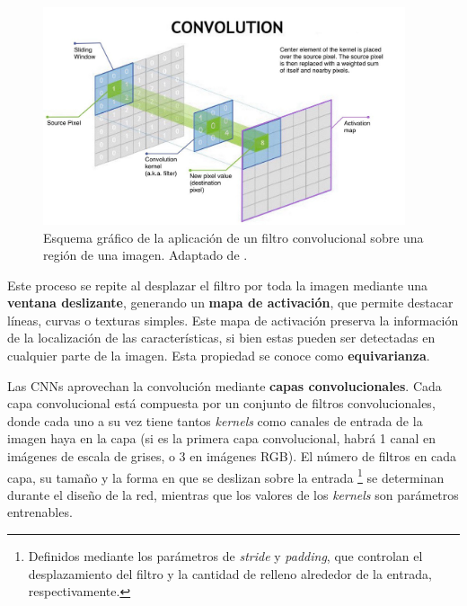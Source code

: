 \begin{figure}[h]
    \centering
    \includegraphics[width=0.95\textwidth]{capitulos/cap_02/imagenes/convolution_operation.jpg}
    \caption[Esquema gráfico de la aplicación de un filtro convolucional sobre una región de una imagen.]{
        Esquema gráfico de la aplicación de un filtro convolucional sobre una región de una imagen.
        Adaptado de \cite{nvidia2025convolutionoperation}.
    } 
    \label{fig:conv_op}
\end{figure}

Este proceso se repite al desplazar el filtro por toda la imagen mediante una \textbf{ventana deslizante}, 
generando un \textbf{mapa de activación}, que permite destacar líneas, curvas o texturas simples. Este mapa de
activación preserva la información de la localización de las características, si bien estas pueden ser 
detectadas en cualquier parte de la imagen. Esta propiedad se conoce como \textbf{equivarianza}. 

Las CNNs aprovechan la convolución mediante \textbf{capas convolucionales}. Cada capa convolucional está
compuesta por un conjunto de filtros convolucionales, donde cada uno a su vez tiene tantos \textit{kernels} 
como canales de entrada de la imagen haya en la capa (si es la primera capa convolucional, habrá 1 canal en 
imágenes de escala de grises, o 3 en imágenes RGB). El número de filtros en cada capa, su tamaño y la forma
en que se deslizan sobre la entrada
\footnote{                                                                      
    Definidos mediante los parámetros de \textit{stride} y \textit{padding}, que controlan el desplazamiento       
    del filtro y la cantidad de relleno alrededor de la entrada, respectivamente.
}
se determinan durante el diseño de la red, mientras que los valores de los \textit{kernels} son parámetros 
entrenables.

